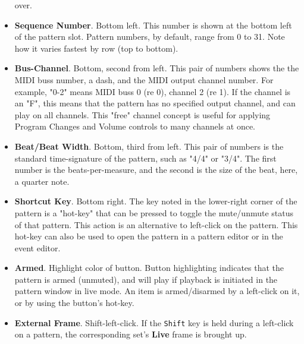 \begin{itemize}
         over.
      \item \textbf{Sequence Number}. Bottom left.
         This number is shown at the bottom left of the pattern slot.
         Pattern numbers, by default, range from 0 to 31.
         Note how it varies fastest by row (top to bottom).
      \item \textbf{Bus-Channel}. Bottom, second from left.
         This pair of numbers shows the the MIDI buss number, a dash, and
         the MIDI output channel number.
         For example, "0-2" means MIDI buss 0 (re 0), channel 2 (re 1).
         If the channel is an "F", this means that the pattern has no specified
         output channel, and can play on all channels.
         This "free" channel concept is useful for applying Program Changes and
         Volume controls to many channels at once.
      \item \textbf{Beat/Beat Width}. Bottom, third from left.
         This pair of numbers is the standard time-signature of the pattern,
         such as "4/4" or "3/4".  The first number is the beats-per-measure,
         and the second is the size of the beat, here, a quarter note.
      \item \textbf{Shortcut Key}.  Bottom right.
         The key noted in the lower-right corner of the pattern is a "hot-key"
         that can be pressed to toggle the mute/unmute status of that pattern.
         This action is an alternative to left-click on the pattern.
         This hot-key can also be used to open the pattern in a pattern editor
         or in the event editor.
      \item \textbf{Armed}. Highlight color of button.
         Button highlighting indicates that the pattern is armed
         (unmuted), and will play if playback is initiated in the pattern
         window in live mode.
         An item is armed/disarmed by a left-click on it, or by using the
         button's hot-key.
      \item \textbf{External Frame}. Shift-left-click.
         If the \texttt{Shift} key is held during a left-click on a pattern,
         the corresponding set's \textbf{Live} frame is brought up.
   \end{itemize}


